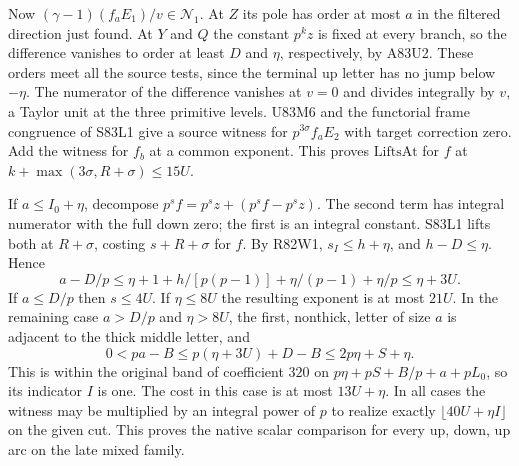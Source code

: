 Now $(\gamma-1)(f_a E_1)/v\in\mathcal N_1$. At $Z$ its pole
has order at most $a$ in the filtered direction just found.
At $Y$ and $Q$ the constant $p^k z$ is fixed at every branch,
so the difference vanishes to order at least $D$ and $\eta$,
respectively, by A83U2. These orders meet all the source tests,
since the terminal up letter has no jump below $-\eta$.
The numerator of the difference vanishes at $v=0$ and divides
integrally by $v$, a Taylor unit at the three primitive levels.
U83M6 and the functorial frame congruence of S83L1 give a source
witness for $p^{3\sigma} f_aE_2$ with target correction zero.
Add the witness for $f_b$ at a common exponent. This proves
$\mathrm{LiftsAt}$ for $f$ at $k+\max(3\sigma,R+\sigma)\le15U$.

If $a\le I_0+\eta$, decompose $p^sf=p^sz+(p^sf-p^sz)$.
The second term has integral numerator with the full down zero;
the first is an integral constant. S83L1 lifts both at
$R+\sigma$, costing $s+R+\sigma$ for $f$. By R82W1,
$s_I\le h+\eta$, and $h-D\le\eta$. Hence
\[
 a-D/p\le\eta+1+h/[p(p-1)]+\eta/(p-1)+\eta/p
                 \le\eta+3U .
\]
If $a\le D/p$ then $s\le4U$. If $\eta\le8U$ the resulting
exponent is at most $21U$. In the remaining case $a>D/p$ and
$\eta>8U$, the first, nonthick, letter of size $a$ is adjacent
to the thick middle letter, and
\[
 0<pa-B\le p(\eta+3U)+D-B\le2p\eta+S+\eta .
\]
This is within the original band of coefficient $320$ on
$p\eta+pS+B/p+a+pL_0$, so its indicator $I$ is one.
The cost in this case is at most $13U+\eta$.
In all cases the witness may be multiplied by an integral
power of $p$ to realize exactly $\lfloor40U+\eta I\rfloor$ on
the given cut. This proves the native scalar comparison for
every up, down, up arc on the late mixed family.
